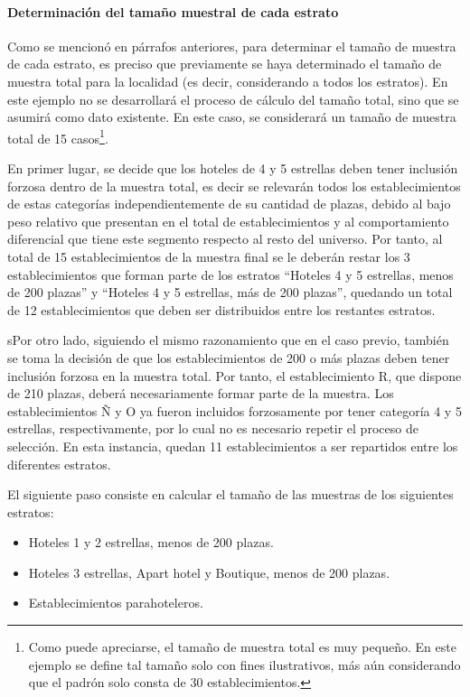\documentclass[
]{book}
\begin{document}
\hypertarget{determinaciuxf3n-del-tamauxf1o-muestral-de-cada-estrato}{%
\paragraph{Determinación del tamaño muestral de cada estrato}\label{determinaciuxf3n-del-tamauxf1o-muestral-de-cada-estrato}}

Como se mencionó en párrafos anteriores, para determinar el tamaño de muestra de cada estrato, es preciso que previamente se haya determinado el tamaño de muestra total para la localidad (es decir, considerando a todos los estratos). En este ejemplo no se desarrollará el proceso de cálculo del tamaño total, sino que se asumirá como dato existente. En este caso, se considerará un tamaño de muestra total de 15 casos\footnote{Como puede apreciarse, el tamaño de muestra total es muy pequeño. En este ejemplo se define tal tamaño solo con fines ilustrativos, más aún considerando que el padrón solo consta de 30 establecimientos.}.

En primer lugar, se decide que los hoteles de 4 y 5 estrellas deben tener inclusión forzosa dentro de la muestra total, es decir se relevarán todos los establecimientos de estas categorías independientemente de su cantidad de plazas, debido al bajo peso relativo que presentan en el total de establecimientos y al comportamiento diferencial que tiene este segmento respecto al resto del universo. Por tanto, al total de 15 establecimientos de la muestra final se le deberán restar los 3 establecimientos que forman parte de los estratos ``Hoteles 4 y 5 estrellas, menos de 200 plazas'' y ``Hoteles 4 y 5 estrellas, más de 200 plazas'', quedando un total de 12 establecimientos que deben ser distribuidos entre los restantes estratos.

sPor otro lado, siguiendo el mismo razonamiento que en el caso previo, también se toma la decisión de que los establecimientos de 200 o más plazas deben tener inclusión forzosa en la muestra total. Por tanto, el establecimiento R, que dispone de 210 plazas, deberá necesariamente formar parte de la muestra. Los establecimientos Ñ y O ya fueron incluidos forzosamente por tener categoría 4 y 5 estrellas, respectivamente, por lo cual no es necesario repetir el proceso de selección. En esta instancia, quedan 11 establecimientos a ser repartidos entre los diferentes estratos.

El siguiente paso consiste en calcular el tamaño de las muestras de los siguientes estratos:

\begin{itemize}
\item
  Hoteles 1 y 2 estrellas, menos de 200 plazas.
\item
  Hoteles 3 estrellas, Apart hotel y Boutique, menos de 200 plazas.
\item
  Establecimientos parahoteleros.
\end{itemize}
\end{document}
